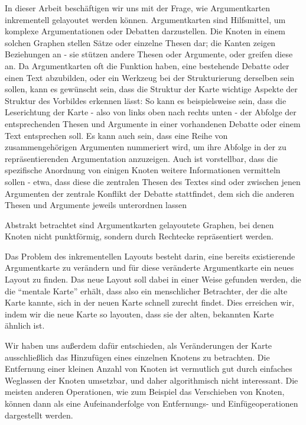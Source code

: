 \label{sub:intro}

In dieser Arbeit beschäftigen wir uns mit der Frage, wie Argumentkarten inkrementell gelayoutet werden können. Argumentkarten sind Hilfsmittel, um komplexe Argumentationen oder Debatten darzustellen. Die Knoten in einem solchen Graphen stellen Sätze oder einzelne Thesen dar; die Kanten zeigen Beziehungen an - sie stützen andere Thesen oder Argumente, oder greifen diese an.
 Da Argumentkarten oft die Funktion haben, eine bestehende Debatte oder einen Text abzubilden, oder ein Werkzeug bei der Strukturierung derselben sein sollen, kann es gewünscht sein, dass die Struktur der Karte wichtige Aspekte der Struktur des Vorbildes erkennen lässt: So kann es beispielsweise sein, dass die Leserichtung der Karte - also von links oben nach rechts unten - der Abfolge der entsprechenden Thesen und Argumente in einer vorhandenen Debatte oder einem Text entsprechen soll. Es kann auch sein, dass eine Reihe von zusammengehörigen Argumenten nummeriert wird, um ihre Abfolge in der zu repräsentierenden Argumentation anzuzeigen. Auch ist vorstellbar, dass die spezifische Anordnung von einigen Knoten weitere Informationen vermitteln sollen - etwa, dass diese die zentralen Thesen des Textes sind oder zwischen jenen Argumenten der zentrale Konflikt der Debatte stattfindet, dem sich die anderen Thesen und Argumente jeweils unterordnen lassen

Abstrakt betrachtet sind Argumentkarten gelayoutete Graphen, bei denen Knoten nicht punktförmig, sondern durch Rechtecke repräsentiert werden.

Das Problem des inkrementellen Layouts besteht darin, eine bereits existierende Argumentkarte zu verändern und für diese veränderte Argumentkarte ein neues Layout zu finden. Das neue Layout soll dabei in einer Weise gefunden werden, die die "`mentale Karte"' erhält, dass also ein menschlicher Betrachter, der die alte Karte kannte, sich in der neuen Karte schnell zurecht findet. Dies erreichen wir, indem wir die neue Karte so layouten, dass sie der alten, bekannten Karte ähnlich ist.

Wir haben uns außerdem dafür entschieden, als Veränderungen der Karte ausschließlich das Hinzufügen eines einzelnen Knotens zu betrachten. Die Entfernung einer kleinen Anzahl von Knoten ist vermutlich gut durch einfaches Weglassen der Knoten umsetzbar, und daher algorithmisch nicht interessant. Die meisten anderen Operationen, wie zum Beispiel das Verschieben von Knoten, können dann als eine Aufeinanderfolge von Entfernungs- und Einfügeoperationen dargestellt werden.

